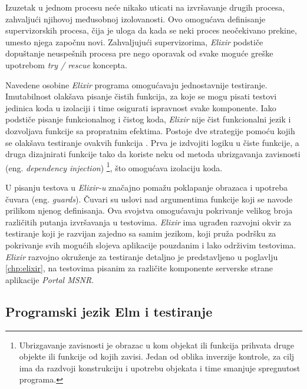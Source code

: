 \documentclass[12pt,oneside]{memoir}
\begin{document}
\par Izuzetak u jednom procesu neće nikako uticati na izvršavanje drugih procesa, zahvaljući njihovoj međusobnoj izolovanosti. Ovo omogućava definisanje supervizorskih procesa, čija je uloga da kada se neki proces neočekivano prekine, umesto njega započnu novi. Zahvaljujući supervizorima, \emph{Elixir} podstiče dopuštanje neuspešnih procesa pre nego oporavak od svake moguće greške upotrebom \emph{try / rescue} koncepta.
\par Navedene osobine \emph{Elixir} programa omogućavaju jednostavnije testiranje. Imutabilnost olakšava pisanje čistih funkcija, za koje se mogu pisati testovi jedinica koda u izolaciji i time osigurati ispravnost svake komponente. Iako podstiče pisanje funkcionalnog i čistog koda, \emph{Elixir} nije čist funkcionalni jezik i dozvoljava funkcije sa propratnim efektima.  Postoje dve strategije pomoću kojih se olakšava testiranje ovakvih funkcija \cite{testingelixir}. Prva je izdvojiti logiku u čiste funkcije, a druga dizajnirati funkcije tako da koriste neku od metoda ubrizgavanja zavisnosti (eng. \textit{dependency injection}) \footnote{Ubrizgavanje zavisnosti je obrazac u kom objekat ili funkcija prihvata druge objekte ili funkcije od kojih zavisi. Jedan od oblika inverzije kontrole, za cilj ima da razdvoji konstrukciju i upotrebu objekata i time smanjuje spregnutost programa.}, što omogućava izolaciju koda.  
\par U pisanju testova u \emph{Elixir-u} značajno pomažu poklapanje obrazaca i upotreba čuvara (eng. \emph{guards}). Čuvari su uslovi nad argumentima funkcije koji se navode prilikom njenog definisanja. Ova svojstva omogućavaju pokrivanje velikog broja različitih putanja izvršavanja u testovima. \emph{Elixir} ima ugrađen razvojni okvir za testiranje koji je razvijan zajedno sa samim jezikom, koji pruža podršku za pokrivanje svih mogućih slojeva aplikacije pouzdanim i lako održivim testovima. \emph{Elixir} razvojno okruženje za testiranje detaljno je predstavljeno u poglavlju \ref{chp:elixir}, na testovima pisanim za različite komponente serverske strane aplikacije \emph{Portal MSNR}. 
 
 
 
\subsection{Programski jezik Elm i testiranje}
\end{document}
